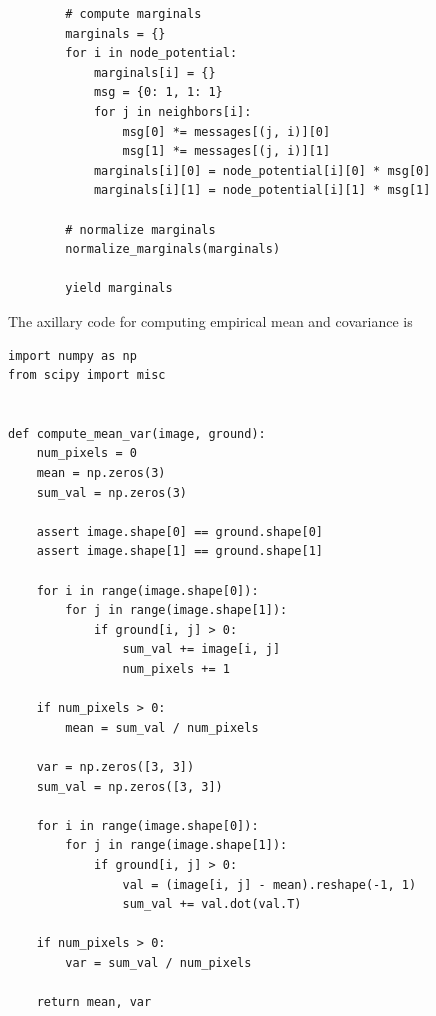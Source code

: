 \documentclass{article}
\begin{document}
\begin{lstlisting}
        # compute marginals
        marginals = {}
        for i in node_potential:
            marginals[i] = {}
            msg = {0: 1, 1: 1}
            for j in neighbors[i]:
                msg[0] *= messages[(j, i)][0]
                msg[1] *= messages[(j, i)][1]
            marginals[i][0] = node_potential[i][0] * msg[0]
            marginals[i][1] = node_potential[i][1] * msg[1]

        # normalize marginals
        normalize_marginals(marginals)

        yield marginals

\end{lstlisting}

The axillary code for computing empirical mean and covariance is 
\lstset{language=Python}
\lstset{frame=lines}
\lstset{basicstyle=\footnotesize}
\begin{lstlisting}
import numpy as np
from scipy import misc


def compute_mean_var(image, ground):
    num_pixels = 0
    mean = np.zeros(3)
    sum_val = np.zeros(3)

    assert image.shape[0] == ground.shape[0]
    assert image.shape[1] == ground.shape[1]

    for i in range(image.shape[0]):
        for j in range(image.shape[1]):
            if ground[i, j] > 0:
                sum_val += image[i, j]
                num_pixels += 1

    if num_pixels > 0:
        mean = sum_val / num_pixels

    var = np.zeros([3, 3])
    sum_val = np.zeros([3, 3])

    for i in range(image.shape[0]):
        for j in range(image.shape[1]):
            if ground[i, j] > 0:
                val = (image[i, j] - mean).reshape(-1, 1)
                sum_val += val.dot(val.T)

    if num_pixels > 0:
        var = sum_val / num_pixels

    return mean, var

\end{lstlisting}
\pagebreak

\end{document}
